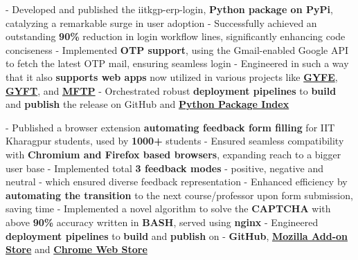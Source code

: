 \documentclass[a4paper,10pt]{extarticle} %
\begin{document}
\begin{description}[style=nextline, font=$\bullet$\hspace{2mm}\normalsize]
\item[{\href{https://github.com/proffapt/iitkgp-erp-login-pypi}{ERP Login Module}} | Python, Gmail API]
- Developed and published the iitkgp-erp-login, \textbf{Python package on PyPi}, catalyzing a remarkable surge in user adoption \newline
- Successfully achieved an outstanding \textbf{90\%} reduction in login workflow lines, significantly enhancing code conciseness \newline
- Implemented \textbf{OTP support}, using the Gmail-enabled Google API to fetch the latest OTP mail, ensuring seamless login \newline
- Engineered in such a way that it also \textbf{supports web apps} now utilized in various projects like \href{https://gyfe.metakgp.org}{\textbf{GYFE}}, \href{https://gyft.metakgp.org}{\textbf{GYFT}}, and \href{https://github.com/metakgp/mftp}{\textbf{MFTP}} \newline
- Orchestrated robust \textbf{deployment pipelines} to \textbf{build} and \textbf{publish} the release on GitHub and \href{https://pypi.org/project/iitkgp-erp-login/}{\textbf{Python Package Index}}

\item[{\href{https://github.com/proffapt/fERP}{fERP}} | HTML, CSS, JavaScript, Web Browser Extension, BASH, Nginx, OCR]
- Published a browser extension \textbf{automating feedback form filling} for IIT Kharagpur students, used by \textbf{1000+} students \newline
- Ensured seamless compatibility with \textbf{Chromium and Firefox based browsers}, expanding reach to a bigger user base \newline
- Implemented total \textbf{3 feedback modes} - positive, negative and neutral - which ensured diverse feedback representation \newline
- Enhanced efficiency by \textbf{automating the transition} to the next course/professor upon form submission, saving  time \newline
- Implemented a novel algorithm to solve the \textbf{CAPTCHA} with above \textbf{90\%} accuracy written in \textbf{BASH}, served using \textbf{nginx} \newline
- Engineered \textbf{deployment pipelines} to \textbf{build} and \textbf{publish} on - \textbf{GitHub}, \href{https://addons.mozilla.org/en-US/firefox/addon/ferp/}{\textbf{Mozilla Add-on Store}} and \href{https://chromewebstore.google.com/detail/ferp/cdmjkgfdjjebpjejjnckkgljdmijjnom?hl=en&authuser=0}{\textbf{Chrome Web Store}}
 

\end{description}
\end{document}
